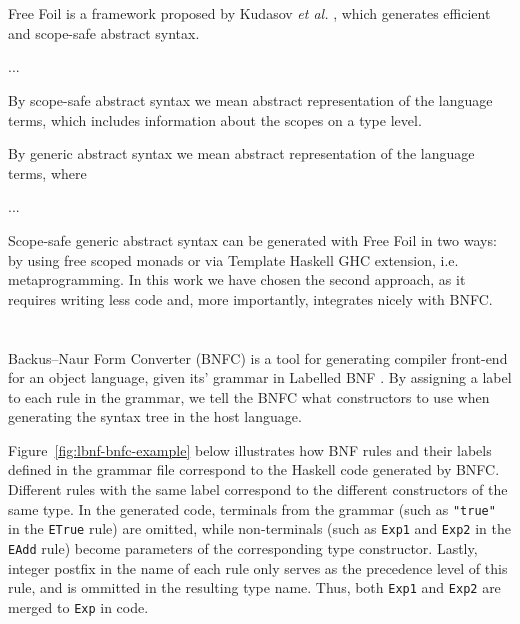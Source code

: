 
\section{}

Free Foil is a framework proposed by Kudasov \textit{et al.} \cite{FreeFoil}, which generates efficient and scope-safe abstract syntax.

...

By scope-safe abstract syntax we mean abstract representation of the language terms, which includes information about the scopes on a type level.

By generic abstract syntax we mean abstract representation of the language terms, where 

...

Scope-safe generic abstract syntax can be generated with Free Foil in two ways: by using free scoped monads or via Template Haskell \cite{SheardPeytonJones2002_TH} GHC extension, i.e. metaprogramming. In this work we have chosen the second approach, as it requires writing less code and, more importantly, integrates nicely with BNFC.


\section{}

Backus–Naur Form Converter (BNFC) \cite{BNFC} is a tool for generating compiler front-end for an object language, given its' grammar in Labelled BNF \cite{BackusNaurForm2003}. By assigning a label to each rule in the grammar, we tell the BNFC what constructors to use when generating the syntax tree in the host language.

Figure~\ref{fig:lbnf-bnfc-example} below illustrates how BNF rules and their labels defined in the grammar file correspond to the Haskell code generated by BNFC. Different rules with the same label correspond to the different constructors of the same type. In the generated code, terminals from the grammar (such as \texttt{"true"} in the \texttt{ETrue} rule) are omitted, while non-terminals (such as \texttt{Exp1} and \texttt{Exp2} in the \texttt{EAdd} rule) become parameters of the corresponding type constructor. Lastly, integer postfix in the name of each rule only serves as the precedence level of this rule, and is ommitted in the resulting type name. Thus, both \texttt{Exp1} and \texttt{Exp2} are merged to \texttt{Exp} in code.


